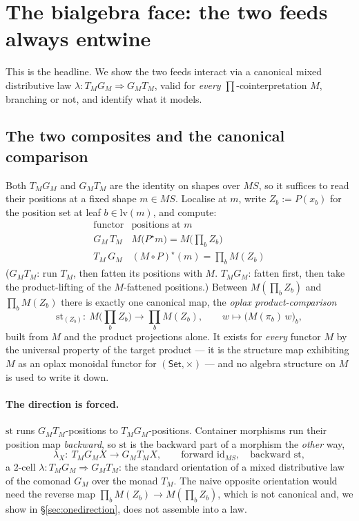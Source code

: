 \documentclass[11pt]{amsart}
\theoremstyle{plain}
\theoremstyle{definition}
\theoremstyle{remark}
\newcommand{\Set}{\mathsf{Set}}
\newcommand{\id}{\mathrm{id}}
\newcommand{\str}{\mathrm{st}}
\newcommand{\lv}{\mathrm{lv}}
\begin{document}
\section{The bialgebra face: the two feeds always entwine}\label{sec:bialgebra}

This is the headline. We show the two feeds interact via a canonical mixed distributive law
$\lambda\colon T_M G_M\Rightarrow G_M T_M$, valid for \emph{every} $\prod$-cointerpretation
$M$, branching or not, and identify what it models.

\subsection{The two composites and the canonical comparison}
Both $T_M G_M$ and $G_M T_M$ are the identity on shapes over $MS$, so it suffices to read
their positions at a fixed shape $m\in MS$. Localise at $m$, write $Z_b := P(x_b)$ for the
position set at leaf $b\in\lv(m)$, and compute:
\[
  \renewcommand{\arraystretch}{1.4}
  \begin{array}{c|c}
    \text{functor} & \text{positions at } m\\\hline
    G_M\,T_M & M\bigl(P^\star m\bigr)=M\bigl(\textstyle\prod_b Z_b\bigr)\\
    T_M\,G_M & (M\circ P)^\star(m)=\textstyle\prod_b M(Z_b)
  \end{array}
\]
($G_M T_M$: run $T_M$, then fatten its positions with $M$. $T_M G_M$: fatten first, then
take the product-lifting of the $M$-fattened positions.) Between $M(\prod_b Z_b)$ and
$\prod_b M(Z_b)$ there is exactly one canonical map, the \emph{oplax product-comparison}
\[
  \str_{(Z_b)}\colon\ M\bigl(\textstyle\prod_b Z_b\bigr)\longrightarrow\prod_b M(Z_b),
  \qquad w\longmapsto\bigl(M(\pi_b)\,w\bigr)_b,
\]
built from $M$ and the product projections alone. It exists for \emph{every} functor $M$ by
the universal property of the target product --- it is the structure map exhibiting $M$ as an
oplax monoidal functor for $(\Set,\times)$ --- and no algebra structure on $M$ is used to
write it down.

\paragraph{The direction is forced.}
$\str$ runs $G_M T_M$-positions to $T_M G_M$-positions. Container morphisms run their
position map \emph{backward}, so $\str$ is the backward part of a morphism the \emph{other}
way,
\[
  \lambda_X\colon\ T_M G_M X\longrightarrow G_M T_M X,\qquad
  \text{forward }\id_{MS},\quad\text{backward }\str,
\]
a $2$-cell $\lambda\colon T_M G_M\Rightarrow G_M T_M$: the standard orientation of a mixed
distributive law of the comonad $G_M$ over the monad $T_M$. The naive opposite orientation
would need the reverse map $\prod_b M(Z_b)\to M(\prod_b Z_b)$, which is not canonical and, we
show in \S\ref{sec:onedirection}, does not assemble into a law.
\end{document}

